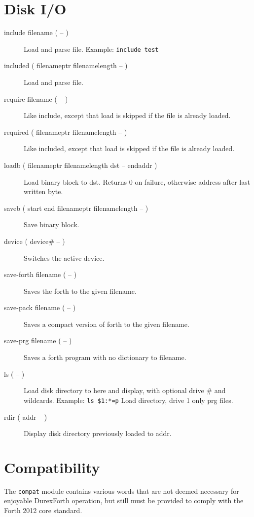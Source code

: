 \section{Disk I/O}

\begin{description}
\item[include filename ( -- )] Load and parse file. Example: \texttt{include test}
\item[included ( filenameptr filenamelength -- )] Load and parse file.
\item[require filename ( -- )] Like include, except that load is skipped if the file is already loaded.
\item[required ( filenameptr filenamelength -- )] Like included, except that load is skipped if the file is already loaded.
\item[loadb ( filenameptr filenamelength dst -- endaddr )] Load binary block to dst. Returns 0 on failure, otherwise address after last written byte.
\item[saveb ( start end filenameptr filenamelength -- )] Save binary block.
\item[device ( device\# -- )] Switches the active device.
\item[save-forth filename ( -- )] Saves the forth to the given filename.
\item[save-pack filename ( -- )] Saves a compact version of forth to the given filename.
\item[save-prg filename ( -- )] Saves a forth program with no dictionary to filename.
\item[ls ( -- )] Load disk directory to here and display, with optional drive \# and wildcards. Example: \texttt{ls \$1:*=p} Load directory, drive 1 only prg files.
\item[rdir ( addr -- )] Display disk directory previously loaded to addr.
\end{description}

\section{Compatibility}

The \texttt{compat} module contains various words that are not deemed necessary for enjoyable DurexForth operation, but still must be provided to comply with the Forth 2012 core standard.

